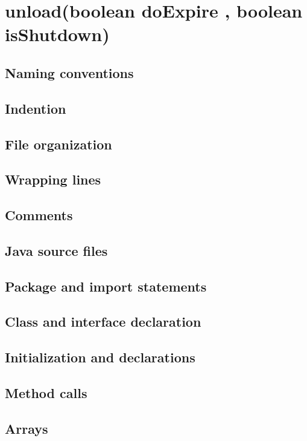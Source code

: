 \section*{unload(boolean doExpire , boolean isShutdown)}
\subsection*{Naming conventions}

\subsection*{Indention}

\subsection*{File organization}

\subsection*{Wrapping lines}

\subsection*{Comments}

\subsection*{Java source files}

\subsection*{Package and import statements}

\subsection*{Class and interface declaration}

\subsection*{Initialization and declarations}

\subsection*{Method calls}

\subsection*{Arrays}

